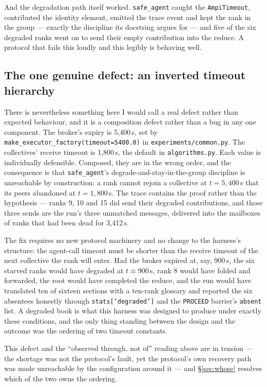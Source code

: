 \documentclass[11pt]{article}
\begin{document}
And the degradation path itself worked. \texttt{safe\_agent} caught the
\texttt{AmpiTimeout}, contributed the identity element, emitted the trace event and kept
the rank in the group --- exactly the discipline its docstring argues for --- and five of
the six degraded ranks went on to send their empty contribution into the reduce. A
protocol that fails this loudly and this legibly is behaving well.

\subsection{The one genuine defect: an inverted timeout hierarchy}

There is nevertheless something here I would call a real defect rather than expected
behaviour, and it is a composition defect rather than a bug in any one component. The
broker's expiry is 5{,}400\,s, set by \texttt{make\_executor\_factory(timeout=5400.0)} in
\texttt{experiments/common.py}. The collectives' receive timeout is 1{,}800\,s, the
default in \texttt{algorithms.py}. Each value is individually defensible. Composed, they
are in the wrong order, and the consequence is that \texttt{safe\_agent}'s
degrade-and-stay-in-the-group discipline is unreachable by construction: a rank cannot
rejoin a collective at $t=5{,}400$\,s that its peers abandoned at $t=1{,}800$\,s. The
trace contains the proof rather than the hypothesis --- ranks 9, 10 and 15 did send their
degraded contributions, and those three sends are the run's three unmatched messages,
delivered into the mailboxes of ranks that had been dead for 3{,}412\,s.

The fix requires no new protocol machinery and no change to the harness's structure: the
agent-call timeout must be shorter than the receive timeout of the next collective the
rank will enter. Had the broker expired at, say, 900\,s, the six starved ranks would have
degraded at $t\approx900$\,s, rank 8 would have folded and forwarded, the root would have
completed the reduce, and the run would have translated ten of sixteen sections with a
ten-rank glossary and reported the six absentees honestly through \texttt{stats['degraded']}
and the \texttt{PROCEED} barrier's \texttt{absent} list. A degraded book is what this
harness was designed to produce under exactly these conditions, and the only thing
standing between the design and the outcome was the ordering of two timeout constants.

This defect and the ``observed through, not of'' reading above are in tension --- the
shortage was not the protocol's fault, yet the protocol's own recovery path was made
unreachable by the configuration around it --- and \S\ref{sec:whose} resolves which of the
two owns the ordering.
\end{document}
